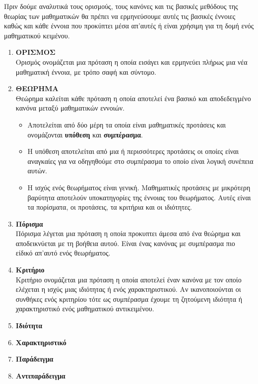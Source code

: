 \documentclass[twoside,10pt]{book}
\begin{document}
Πριν δούμε αναλυτικά τους ορισμούς, τους κανόνες και τις βασικές μεθόδους της θεωρίας των μαθηματικών θα πρέπει να ερμηνεύσουμε αυτές τις βασικές έννοιες καθώς και κάθε έννοια που προκύπτει μέσα απ\textquoteright αυτές ή είναι χρήσιμη για τη δομή ενός μαθηματικού κειμένου.
\begin{enumerate}[label=\large{\bf B-\arabic*.}]
\item \textbf{ΟΡΙΣΜΟΣ}\\
Ορισμός ονομάζεται μια πρόταση η οποία εισάγει και ερμηνεύει πλήρως μια νέα μαθηματική έννοια, με τρόπο σαφή και σύντομο.
\item \textbf{ΘΕΩΡΗΜΑ}\\
Θεώρημα καλείται κάθε πρόταση η οποία αποτελεί ένα βασικό και αποδεδειγμένο κανόνα μεταξύ μαθηματικών εννοιών. \begin{itemize}[itemsep=0mm]
\item Αποτελείται από δύο μέρη τα οποία είναι μαθηματικές προτάσεις και ονομάζονται \textbf{υπόθεση} και \textbf{συμπέρασμα}.
\item Η υπόθεση αποτελείται από μια ή περισσότερες προτάσεις οι οποίες είναι αναγκαίες για να οδηγηθούμε στο συμπέρασμα το οποίο είναι λογική συνέπεια αυτών.
\item Η ισχύς ενός θεωρήματος είναι γενική. Μαθηματικές προτάσεις με μικρότερη βαρύτητα αποτελούν υποκατηγορίες της έννοιας του θεωρήματος. Αυτές είναι τα πορίσματα, οι προτάσεις, τα κριτήρια και οι ιδιότητες.
\end{itemize}
\item \textbf{Πόρισμα}\\
Πόρισμα λέγεται μια πρόταση η οποία προκυπτει άμεσα από ένα θεώρημα και αποδεικνύεται με τη βοήθεια αυτού. Είναι ένας κανόνας με συμπέρασμα πιο είδικό απ\textquoteright αυτό ενός θεωρήματος.
\item \textbf{Κριτήριο}\\
Κριτήριο ονομάζεται μια πρόταση η οποία αποτελεί έναν κανόνα με τον οποίο ελέχεται η ισχύς μιας ιδιότητας ή ενός χαρακτηριστικού. Αν ικανοποιούνται οι συνθήκες ενός κριτηρίου τότε ως συμπέρασμα έχουμε τη ζητούμενη ιδιότητα ή χαρακτηριστικό ενός μαθηματικού αντικειμένου.
\item \textbf{Ιδιότητα}\\
\item \textbf{Χαρακτηριστικό}\\
\item \textbf{Παράδειγμα}\\
\item \textbf{Αντιπαράδειγμα}\\

\end{enumerate}
\end{document}
